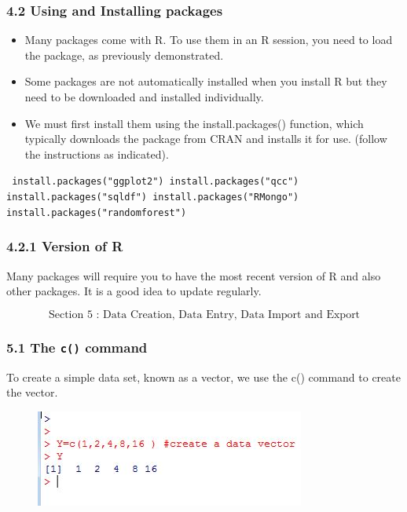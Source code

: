 \documentclass{beamer}
\begin{document}
 	\begin{frame}
 		\frametitle{4.2 Using and Installing packages}
 		\begin{itemize}
 			\item Many packages come with R. To use them in an R session, you need to load the package, as
 			previously demonstrated.
 			\item Some packages are not automatically installed when you install R but they need to be downloaded
 			and installed individually. 
 			\item We must first install them using the install.packages()
 			function, which typically downloads the package from CRAN and installs it for use. (follow the
 			instructions as indicated).
 		\end{itemize}
 	\end{frame}
 	\begin{frame}
 		\texttt{
 			install.packages("ggplot2")
 			install.packages("qcc")
 			install.packages("sqldf")
 			install.packages("RMongo")
 			install.packages("randomforest")}
 		
 	\end{frame}
 	\begin{frame}
 		\frametitle{4.2.1 Version of R}
 		Many packages will require you to have the most recent version of R and also other packages.
 		It is a good idea to update regularly.
 	\end{frame}
 	\begin{frame}
 		\[\mbox{Section 5 : Data Creation, Data Entry, Data Import and Export}\]
 	\end{frame}
 	\begin{frame}
 		\frametitle{5.1 The \texttt{c()} command}
 		To create a simple data set, known as a vector, we use the c() command to create the vector.
 		\begin{figure}
 			\centering
 			\includegraphics[width=1.2\linewidth]{images/makevector1}
 		\end{figure}
 		
 		
 	\end{frame}
\end{document}
